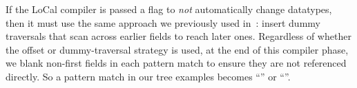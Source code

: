 If the LoCal compiler is passed a flag to {\em not} automatically change
datatypes, then it must use the same approach we previously used in~\cite{ecoop17-gibbon}:
insert {dummy traversals} that scan across earlier
fields to reach later ones.
%
Regardless of whether the offset or dummy-traversal strategy is used,
%
at the end of this compiler phase, we blank non-first fields in
each pattern match to ensure they are not referenced directly.
So a pattern match in our tree examples becomes
 ``'' or   ``''.







